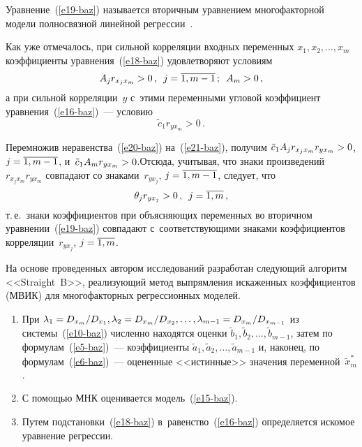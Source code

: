 \begin{multicols}{2}
  Уравнение~(\ref{e19-baz}) называется вторичным уравнением многофакторной 
модели полносвязной линейной регрессии~\cite{10-baz}.
  
  Как уже отмечалось, при сильной корреляции входных переменных $x_1, x_2, 
\ldots , x_m$ коэффициенты уравнения~(\ref{e18-baz}) удовлетворяют условиям
  \begin{equation}
  A_j r_{x_j x_m}>0\,,\enskip j=\overline{1,m-1}\,;\enskip A_m>0\,,
  \label{e20-baz}
  \end{equation}
а при сильной корреляции~$y$ с~этими переменными угловой коэффициент 
уравнения~(\ref{e16-baz})~--- условию
\begin{equation}
\tilde{c}_1 r_{yx_m}>0\,.
\label{e21-baz}
\end{equation}
  
  Перемножив неравенства~(\ref{e20-baz}) на~(\ref{e21-baz}), получим 
$\tilde{c}_1 A_j r_{x_jx_m} r_{yx_m}\hm>0$, $ j\hm=\overline{1,m-1}$, 
и~$\tilde{c}_1 A_m r_{yx_m}\hm>0$.\linebreak Отсюда, учитывая, что знаки 
произведений~$r_{x_jx_m}r_{yx_m}$ совпадают со знаками~$r_{yx_j}$,  
$j\hm=\overline{1,m-1}$, следует, что
  \begin{equation*}
  \theta_j r_{yx_j}>0\,,\enskip    j=\overline{1,m}\,,
  \end{equation*}
т.\,е.\ знаки коэффициентов при объясняющих переменных во вторичном 
уравнении~(\ref{e19-baz}) совпадают с~соответствующими знаками 
коэффициентов корреляции~$r_{yx_j}$, $j\hm=\overline{1,m}$.
  
  На основе проведенных автором исследований разработан следующий 
алгоритм <<Straight~B>>, реализующий метод выпрямления искаженных 
коэффициентов (МВИК) для многофакторных регрессионных моделей.
  \begin{enumerate}[1.]
\item При $\lambda_1=D_{x_m}/D_{x_1}, \lambda_2\hm= D_{x_m}/D_{x_2}, 
\ldots, \lambda_{m-1}\hm= D_{x_m}/D_{x_{m-1}}$ из системы~(\ref{e10-baz}) 
численно находятся оценки $\tilde{b}_1, \tilde{b}_2, \ldots , \tilde{b}_{m-1}$, 
затем по формулам~(\ref{e5-baz})~--- коэффициенты $\tilde{a}_1, \tilde{a}_2, 
\ldots , \tilde{a}_{m-1}$ и, наконец, по формулам~(\ref{e6-baz})~--- оцененные 
<<истинные>> значения переменной~$\tilde{x}_m^*$.
\item С помощью МНК оценивается модель~(\ref{e15-baz}).
\item Путем подстановки~(\ref{e18-baz}) в~равенство~(\ref{e16-baz}) определяется 
искомое уравнение регрессии.
\end{enumerate}


\end{multicols}
